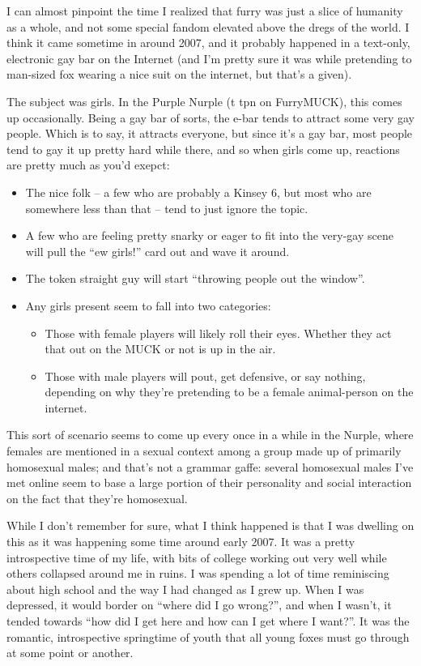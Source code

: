 
I can almost pinpoint the time I realized that furry was just a slice of humanity as a whole, and not some special fandom elevated above the dregs of the world.  I think it came sometime in around 2007, and it probably happened in a text-only, electronic gay bar on the Internet (and I'm pretty sure it was while pretending to man-sized fox wearing a nice suit on the internet, but that's a given).


The subject was girls.  In the Purple Nurple (t tpn on FurryMUCK), this comes up occasionally.  Being a gay bar of sorts, the e-bar tends to attract some very gay people.  Which is to say, it attracts everyone, but since it's a gay bar, most people tend to gay it up pretty hard while there, and so when girls come up, reactions are pretty much as you'd exepct:

\begin{itemize}
  \item The nice folk -- a few who are probably a Kinsey 6, but most who are somewhere less than that -- tend to just ignore the topic.
  \item A few who are feeling pretty snarky or eager to fit into the very-gay scene will pull the “ew girls!” card out and wave it around.
  \item The token straight guy will start “throwing people out the window”.
  \item Any girls present seem to fall into two categories:
    \begin{itemize}
      \item Those with female players will likely roll their eyes. Whether they act that out on the MUCK or not is up in the air.
      \item Those with male players will pout, get defensive, or say nothing, depending on why they're pretending to be a female animal-person on the internet.
    \end{itemize}
\end{itemize}

This sort of scenario seems to come up every once in a while in the Nurple, where females are mentioned in a sexual context among a group made up of primarily homosexual males; and that's not a grammar gaffe: several homosexual males I've met online seem to base a large portion of their personality and social interaction on the fact that they're homosexual.

While I don't remember for sure, what I think happened is that I was dwelling on this as it was happening some time around early 2007.  It was a pretty introspective time of my life, with bits of college working out very well while others collapsed around me in ruins.  I was spending a lot of time reminiscing about high school and the way I had changed as I grew up.  When I was depressed, it would border on “where did I go wrong?”, and when I wasn't, it tended towards “how did I get here and how can I get where I want?”. It was the romantic, introspective springtime of youth that all young foxes must go through at some point or another.

